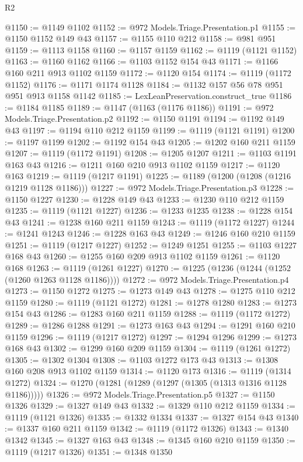\begin{lexlean}{R2}
\begin{coremodule}
@1150 := @1149 @1102
@1152 := @972 Models.Triage.Presentation.p1
@1155 := @1150 @1152 @149 @43
@1157 := @1155 @110 @212
@1158 := @981 @951
@1159 := @1113 @1158
@1160 := @1157 @1159
@1162 := @1119 (@1121 @1152)
@1163 := @1160 @1162
@1166 := @1103 @1152 @154 @43
@1171 := @1166 @160 @211 @913 @1102 @1159
@1172 := @1120 @154
@1174 := @1119 (@1172 @1152)
@1176 := @1171 @1174 @1128
@1184 := @1132 @157 @56 @78 @951 @951 @913 @1158 @1142
@1185 := LexLeanPreservation.construct_true
@1186 := @1184 @1185
@1189 := @1147 (@1163 (@1176 @1186))
@1191 := @972 Models.Triage.Presentation.p2
@1192 := @1150 @1191
@1194 := @1192 @149 @43
@1197 := @1194 @110 @212 @1159
@1199 := @1119 (@1121 @1191)
@1200 := @1197 @1199
@1202 := @1192 @154 @43
@1205 := @1202 @160 @211 @1159
@1207 := @1119 (@1172 @1191)
@1208 := @1205 @1207
@1211 := @1103 @1191 @163 @43
@1216 := @1211 @160 @210 @913 @1102 @1159
@1217 := @1120 @163
@1219 := @1119 (@1217 @1191)
@1225 := @1189 (@1200 (@1208 (@1216 @1219 @1128 @1186)))
@1227 := @972 Models.Triage.Presentation.p3
@1228 := @1150 @1227
@1230 := @1228 @149 @43
@1233 := @1230 @110 @212 @1159
@1235 := @1119 (@1121 @1227)
@1236 := @1233 @1235
@1238 := @1228 @154 @43
@1241 := @1238 @160 @211 @1159
@1243 := @1119 (@1172 @1227)
@1244 := @1241 @1243
@1246 := @1228 @163 @43
@1249 := @1246 @160 @210 @1159
@1251 := @1119 (@1217 @1227)
@1252 := @1249 @1251
@1255 := @1103 @1227 @168 @43
@1260 := @1255 @160 @209 @913 @1102 @1159
@1261 := @1120 @168
@1263 := @1119 (@1261 @1227)
@1270 := @1225 (@1236 (@1244 (@1252 (@1260 @1263 @1128 @1186))))
@1272 := @972 Models.Triage.Presentation.p4
@1273 := @1150 @1272
@1275 := @1273 @149 @43
@1278 := @1275 @110 @212 @1159
@1280 := @1119 (@1121 @1272)
@1281 := @1278 @1280
@1283 := @1273 @154 @43
@1286 := @1283 @160 @211 @1159
@1288 := @1119 (@1172 @1272)
@1289 := @1286 @1288
@1291 := @1273 @163 @43
@1294 := @1291 @160 @210 @1159
@1296 := @1119 (@1217 @1272)
@1297 := @1294 @1296
@1299 := @1273 @168 @43
@1302 := @1299 @160 @209 @1159
@1304 := @1119 (@1261 @1272)
@1305 := @1302 @1304
@1308 := @1103 @1272 @173 @43
@1313 := @1308 @160 @208 @913 @1102 @1159
@1314 := @1120 @173
@1316 := @1119 (@1314 @1272)
@1324 := @1270 (@1281 (@1289 (@1297 (@1305 (@1313 @1316 @1128 @1186)))))
@1326 := @972 Models.Triage.Presentation.p5
@1327 := @1150 @1326
@1329 := @1327 @149 @43
@1332 := @1329 @110 @212 @1159
@1334 := @1119 (@1121 @1326)
@1335 := @1332 @1334
@1337 := @1327 @154 @43
@1340 := @1337 @160 @211 @1159
@1342 := @1119 (@1172 @1326)
@1343 := @1340 @1342
@1345 := @1327 @163 @43
@1348 := @1345 @160 @210 @1159
@1350 := @1119 (@1217 @1326)
@1351 := @1348 @1350

\end{coremodule}
\end{lexlean}
